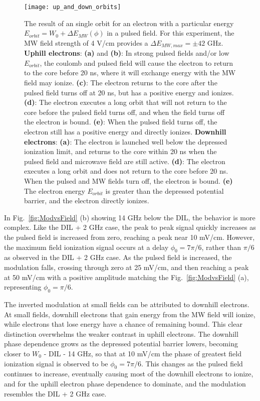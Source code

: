 \documentclass[aps,pra,preprint,groupedaddress]{revtex4-1}
\begin{document}
\begin{figure}
	\texttt{[image: up\_and\_down\_orbits]}
	\caption{The result of an single orbit for an electron with a particular energy $E_{orbit} = W_0 + \Delta E_{MW}(\phi)$ in a pulsed field. For this experiment, the MW field strength of 4 V/cm provides a $\Delta E_{MW,max} = \pm 42$ GHz. \textbf{Uphill electrons}: \textbf{(a)} and \textbf{(b)}: In strong pulsed fields and/or low $E_{orbit}$, the coulomb and pulsed field will cause the electron to return to the core before 20 ns, where it will exchange energy with the MW field may ionize. \textbf{(c)}: The electron returns to the core after the pulsed field turns off at 20 ns, but has a positive energy and ionizes. \textbf{(d)}: The electron executes a long orbit that will not return to the core before the pulsed field turns off, and when the field turns off the electron is bound. \textbf{(e)}: When the pulsed field turns off, the electron still has a positive energy and directly ionizes. \textbf{Downhill electrons}: \textbf{(a)}: The electron is launched well below the depressed ionization limit, and returns to the core within 20 ns when the pulsed field and microwave field are still active. \textbf{(d)}: The electron executes a long orbit and does not return to the core before 20 ns. When the pulsed and MW fields turn off, the electron is bound. \textbf{(e)} The electron energy $E_{orbit}$ is greater than the depressed potential barrier, and the electron directly ionizes.}
	\label{fig:Orbits}
\end{figure}

In Fig.~\ref{fig:ModvsField} (b) showing 14 GHz below the DIL, the behavior is more complex. Like the DIL + 2 GHz case, the peak to peak signal quickly increases as the pulsed field is increased from zero, reaching a peak near 10 mV/cm. However, the maximum field ionization signal occurs at a delay $\phi_0 = 7\pi/6$, rather than $\pi/6$ as observed in the DIL + 2 GHz case. As the pulsed field is increased, the modulation falls, crossing through zero at 25 mV/cm, and then reaching a peak at 50 mV/cm with a positive amplitude matching the Fig.~\ref{fig:ModvsField} (a), representing $\phi_0 = \pi/6$.

The inverted modulation at small fields can be attributed to downhill electrons. At small fields, downhill electrons that gain energy from the MW field will ionize, while electrons that lose energy have a chance of remaining bound. This clear distinction overwhelms the weaker contrast in uphill electrons. The downhill phase dependence grows as the depressed potential barrier lowers, becoming closer to $W_0$ - DIL - 14 GHz, so that at 10 mV/cm the phase of greatest field ionization signal is observed to be $\phi_0 = 7\pi/6$. This changes as the pulsed field continues to increase, eventually causing most of the downhill electrons to ionize, and for the uphill electron phase dependence to dominate, and the modulation resembles the DIL + 2 GHz case.
\end{document}
